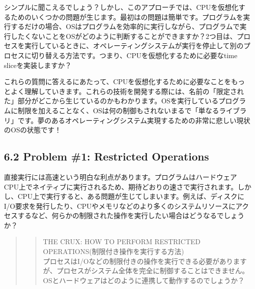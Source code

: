 シンプルに聞こえるでしょう？しかし、このアプローチでは、CPUを仮想化するためのいくつかの問題が生じます。最初はの問題は簡単です。プログラムを実行するだけの場合、OSはプログラムを効率的に実行しながら、プログラムで実行したくないことをOSがどのように判断することができますか？2つ目は、プロセスを実行しているときに、オペレーティングシステムが実行を停止して別のプロセスに切り替える方法です。つまり、CPUを仮想化するために必要なtime
sliceを実装しますか？

これらの質問に答えるにあたって、CPUを仮想化するために必要なことをもっとよく理解していきます。これらの技術を開発する際には、名前の「限定された」部分がどこから生じているのかもわかります。OSを実行しているプログラムに制限を加えることなく、OSは何の制御もされないまるで「単なるライブラリ」です。夢のあるオペレーティングシステム実現するための非常に悲しい現状のOSの状態です！

\hypertarget{problem-1-restricted-operations}{%
\subsection*{6.2 Problem \#1: Restricted
Operations}\label{problem-1-restricted-operations}}

直接実行には高速という明白な利点があります。プログラムはハードウェアCPU上でネイティブに実行されるため、期待どおりの速さで実行されます。しかし、CPU上で実行すると、ある問題が生じてしまいます。例えば、ディスクにI/O要求を発行したり、CPUやメモリなどのより多くのシステムリソースにアクセスするなど、何らかの制限された操作を実行したい場合はどうなるでしょうか？

\begin{quote}
\begin{quote}
THE CRUX: HOW TO PERFORM RESTRICTED
OPERATIONS(制限付き操作を実行する方法)\\
プロセスはI/Oなどの制限付きの操作を実行できる必要がありますが、プロセスがシステム全体を完全に制御することはできません。OSとハードウェアはどのように連携して動作するのでしょうか？
\end{quote}
\end{quote}

